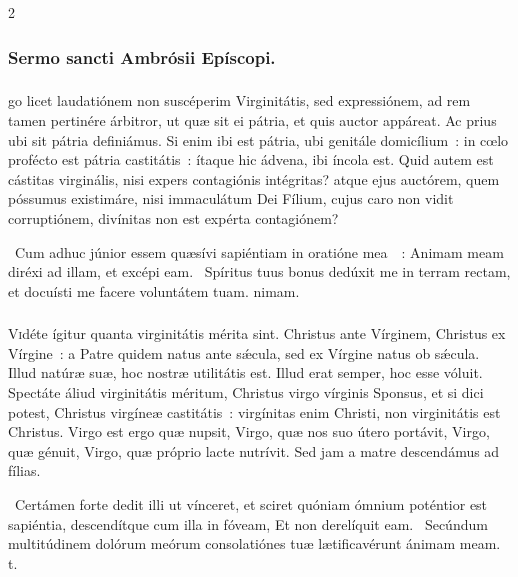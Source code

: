 \documentclass[9pt,twoside]{extarticle}
\begin{document}
\begin{multicols}{2}
{{\subsubsection*{\center Sermo sancti Ambrósii Epíscopi.}
\subsubsection*{\center {}}
go licet laudatiónem non suscéperim Virginitátis, sed expressiónem, ad rem tamen pertinére árbitror, ut quæ sit ei pátria, et quis auctor appáreat. Ac prius ubi sit pátria definiámus. Si enim ibi est pátria, ubi genitále domicílium~: in cœlo profécto est pátria castitátis~: ítaque hic ádvena, ibi íncola est. Quid autem est cástitas virginális, nisi expers contagiónis intégritas? atque ejus auctórem, quem póssumus existimáre, nisi immaculátum Dei Fílium, cujus caro non vidit corruptiónem, divínitas non est expérta contagiónem?

\begin{tightlist}{}
\item {}~Cum adhuc júnior essem quæsívi sapiéntiam in oratióne mea~~: \textred{*} Animam meam diréxi ad illam, et excépi eam. ~Spíritus tuus bonus dedúxit me in terram rectam, et docuísti me facere voluntátem tuam. nimam.
\end{tightlist}

\subsubsection*{\center {}}
\lettrine{V}idéte ígitur quanta virginitátis mérita sint. Christus ante Vírginem, Christus ex Vírgine~: a Patre quidem natus ante sǽcula, sed ex Vírgine natus ob sǽcula. Illud natúræ suæ, hoc nostræ utilitátis est. Illud erat semper, hoc esse vóluit. Spectáte áliud virginitátis méritum, Christus virgo vírginis Sponsus, et si dici potest, Christus virgíneæ castitátis~: virgínitas enim Christi, non virginitátis est Christus. Virgo est ergo quæ nupsit, Virgo, quæ nos suo útero portávit, Virgo, quæ génuit, Virgo, quæ próprio lacte nutrívit. Sed jam a matre descendámus ad fílias.

\begin{tightlist}{}
\item {}~Certámen forte dedit illi ut vínceret, et sciret quóniam ómnium poténtior est sapiéntia, descendítque cum illa in fóveam, \textred{*} Et non derelíquit eam. ~Secúndum multitúdinem dolórum meórum consolatiónes tuæ lætificavérunt ánimam meam. t.
\end{tightlist}

}}
\end{multicols}
\end{document}
